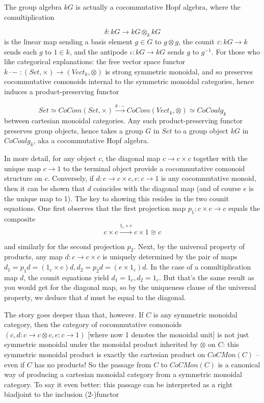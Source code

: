 \documentclass[12pt,titlepage]{article}
\theoremstyle{plain}
\theoremstyle{definition}
\theoremstyle{remark}
\begin{document}
The group algebra $k G$ is actually a cocommutative Hopf algebra, where the comultiplication

\begin{displaymath}
\delta: k G \to k G \otimes_k k G
\end{displaymath}
is the linear map sending a basis element $g \in G$ to $g \otimes g$, the counit $\varepsilon: k G \to k$ sends each $g$ to $1 \in k$, and the antipode $\iota: k G \to k G$ sends $g$ to $g^{-1}$. For those who like categorical explanations: the free vector space functor $k \cdot -\; : (Set, \times) \to (Vect_k, \otimes)$ is strong symmetric monoidal, and so preserves cocommutative comonoids internal to the symmetric monoidal categories, hence induces a product-preserving functor

\begin{displaymath}
Set \simeq CoCom(Set, \times) \stackrel{k \cdot -}{\to} CoCom(Vect_k, \otimes) \simeq CoCoalg_k
\end{displaymath}
between cartesian monoidal categories. Any such product-preserving functor preserves group objects, hence takes a group $G$ in $Set$ to a group object $k G$ in $CoCoalg_k$, aka a cocommutative Hopf algebra.


In more detail, for any object $c$, the diagonal map $c \to c \times c$ together
with the unique map $c \to 1$ to the terminal object provide a cocommutative
comonoid structure on $c$. Conversely, if $d: c \to c \times c, e: c \to 1$ is any
cocommutative monoid, then it can be shown that $d$ coincides with the
diagonal map (and of course $e$ is the unique map to 1). The key to showing
this resides in the two counit equations. One first observes that the first
projection map $p_1: c \times c \to c$ equals the composite
\begin{displaymath}
c \times c \xrightarrow{1_c \times e} c \times 1 \cong c
\end{displaymath}

and similarly for the second projection $p_2$. Next, by the universal
property of products, any map $d: c \to c \times c$ is uniquely determined by the
pair of maps $d_1 = p_1 d = (1_c \times e)d,  d_2 = p_2 d = (e \times 1_c)d$. In the
case of a comultiplication map $d$, the counit equations yield $d_1 = 1_c, d_2 = 1_c$.
But that's the same result as you would get for the diagonal map,
so by the uniqueness clause of the universal property, we deduce that $d$
must be equal to the diagonal.

The story goes deeper than that, however. If $C$ is any symmetric monoidal
category, then the category of cocommutative comonoids $(c, d: c \to c \otimes c, e: c \to 1)$
[where now 1 denotes the monoidal unit] is not just
symmetric monoidal under the monoidal product inherited by $\otimes$ on $C$:
this symmetric monoidal product is exactly the cartesian product on
$CoCMon(C)$ -- even if $C$ has no products!  So the passage from $C$ to $CoCMon(C)$
is a canonical way of producing a cartesian monoidal category from a
symmetric monoidal category.  To say it even better: this passage can be
interpreted as a right biadjoint to the inclusion (2-)functor
\end{document}
